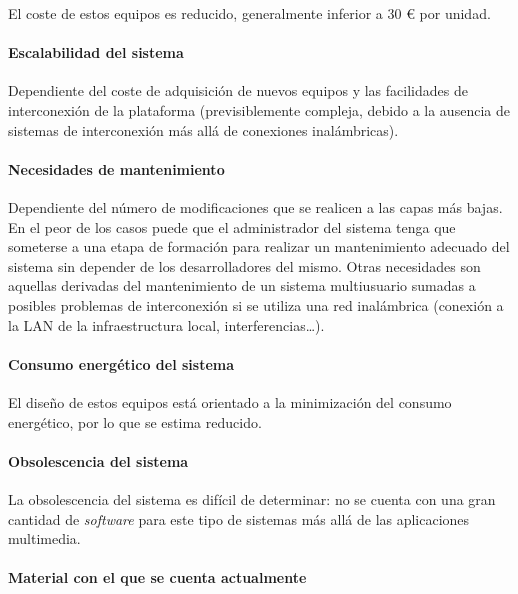 El coste de estos equipos es reducido, generalmente inferior a 30 € por unidad.

\paragraph{Escalabilidad del sistema\\}

Dependiente del coste de adquisición de nuevos equipos y las facilidades de interconexión de la plataforma (previsiblemente compleja, debido a la ausencia de sistemas de interconexión más allá de conexiones inalámbricas).

\paragraph{Necesidades de mantenimiento\\}

Dependiente del número de modificaciones que se realicen a las capas más bajas. En el peor de los casos puede que el administrador del sistema tenga que someterse a una etapa de formación para realizar un mantenimiento adecuado del sistema sin depender de los desarrolladores del mismo.
Otras necesidades son aquellas derivadas del mantenimiento de un sistema multiusuario sumadas a posibles problemas de interconexión si se utiliza una red inalámbrica (conexión a la LAN de la infraestructura local, interferencias\dots).

\paragraph{Consumo energético del sistema\\}

El diseño de estos equipos está orientado a la minimización del consumo energético, por lo que se estima reducido.

\paragraph{Obsolescencia del sistema\\}

La obsolescencia del sistema es difícil de determinar: no se cuenta con una gran cantidad de \textit{software} para este tipo de sistemas más allá de las aplicaciones multimedia.%

\paragraph{Material con el que se cuenta actualmente\\}


